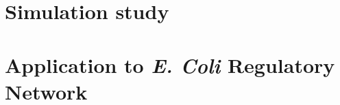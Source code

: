\documentclass[authoryear]{elsarticle}
\begin{document}


\section{Simulation study} \label{Sec:Simul}



\section{Application to \textit{E. Coli} Regulatory Network}
\label{Sec:Appli} 



%



\end{document}
